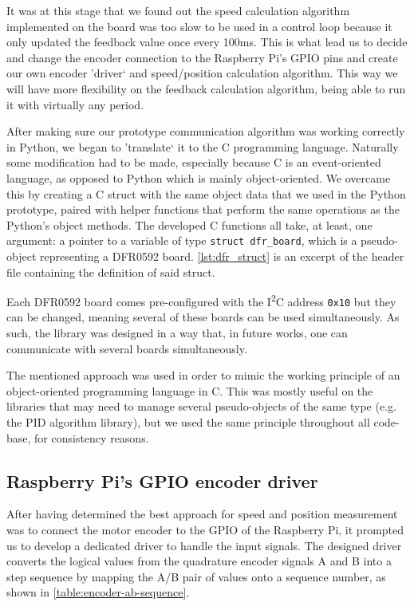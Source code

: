 It was at this stage that we found out the speed calculation algorithm implemented on the board was too slow to be used in a control loop because it only updated the feedback value once every 100ms.
This is what lead us to decide and change the encoder connection to the Raspberry Pi's GPIO pins and create our own encoder 'driver` and speed/position calculation algorithm.
This way we will have more flexibility on the feedback calculation algorithm, being able to run it with virtually any period.

After making sure our prototype communication algorithm was working correctly in Python, we began to 'translate` it to the C programming language.
Naturally some modification had to be made, especially because C is an event-oriented language, as opposed to Python which is mainly object-oriented.
We overcame this by creating a C struct with the same object data that we used in the Python prototype, paired with helper functions that perform the same operations as the Python's object methods.
The developed C functions all take, at least, one argument: a pointer to a variable of type \verb|struct dfr_board|, which is a pseudo-object representing a DFR0592 board.
\autoref{lst:dfr_struct} is an excerpt of the header file containing the definition of said struct.



Each DFR0592 board comes pre-configured with the I\textsuperscript{2}C address \verb|0x10| but they can be changed, meaning several of these boards can be used simultaneously.
As such, the library was designed in a way that, in future works, one can communicate with several boards simultaneously.

The mentioned approach was used in order to mimic the working principle of an object-oriented programming language in C.
This was mostly useful on the libraries that may need to manage several pseudo-objects of the same type (e.g. the PID algorithm library), but we used the same principle throughout all code-base, for consistency reasons.

\subsection{Raspberry Pi's GPIO encoder driver}
After having determined the best approach for speed and position measurement was to connect the motor encoder to the GPIO of the Raspberry Pi, it prompted us to develop a dedicated driver to handle the input signals.
The designed driver converts the logical values from the quadrature encoder signals A and B into a step sequence by mapping the A/B pair of values onto a sequence number, as shown in \autoref{table:encoder-ab-sequence}.

